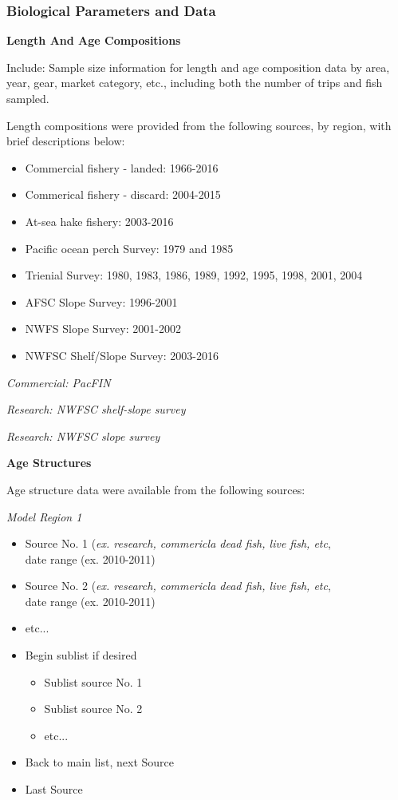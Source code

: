 \documentclass[12pt,]{article}
\begin{document}
\subsubsection{Biological Parameters and
Data}\label{biological-parameters-and-data}

\textbf{Length And Age Compositions}

Include: Sample size information for length and age composition data by
area, year, gear, market category, etc., including both the number of
trips and fish sampled.

Length compositions were provided from the following sources, by region,
with brief descriptions below:

\begin{itemize}[noitemsep,nolistsep,topsep=0pt]
  \item Commercial fishery - landed: 1966-2016
  \item Commerical fishery - discard: 2004-2015
  \item At-sea hake fishery: 2003-2016
  \item Pacific ocean perch Survey: 1979 and 1985
  \item Trienial Survey: 1980, 1983, 1986, 1989, 1992, 1995, 1998, 2001, 2004
  \item AFSC Slope Survey: 1996-2001
  \item NWFS Slope Survey: 2001-2002
  \item NWFSC Shelf/Slope Survey: 2003-2016
\end{itemize}

\emph{Commercial: PacFIN}

\emph{Research: NWFSC shelf-slope survey}

\emph{Research: NWFSC slope survey}

\vspace{.5cm} \textbf{Age Structures}

Age structure data were available from the following sources:

\emph{Model Region 1}

\begin{itemize}[noitemsep,nolistsep,topsep=0pt]
  \item Source No. 1 (\emph{ex. research, commericla dead fish, live fish, etc},\\ 
        date range (ex. 2010-2011)
  \item Source No. 2 (\emph{ex. research, commericla dead fish, live fish, etc},\\
        date range (ex. 2010-2011) 
  \item etc...      
  \item Begin sublist if desired 
    \begin{itemize}[noitemsep,nolistsep]
      \item Sublist source No. 1     
      \item Sublist source No. 2        
      \item etc...     
    \end{itemize}
  \item Back to main list, next Source     
  \item Last Source     
\end{itemize}
\end{document}
